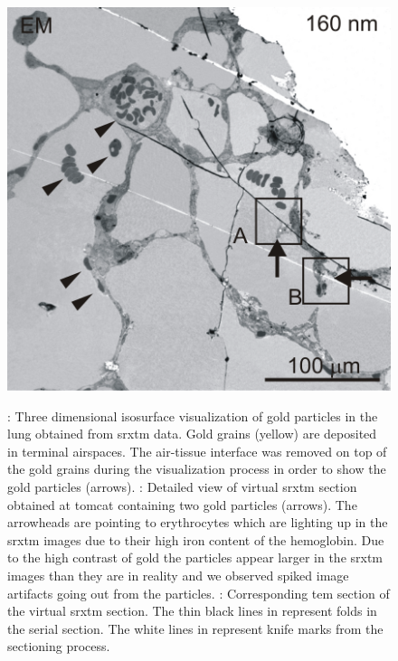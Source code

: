 \begin{figure}
{		\includegraphics[height=\imsize]{img/XRM2008/em/au900-1b-b}%
		\label{subfig:slice-em}%
		}%
	\caption[Three dimensional isosurface visualization of gold particles in the lung obtained from SRXTM data]{: Three dimensional isosurface visualization of gold particles in the lung obtained from \ac{srxtm} data. Gold grains (yellow) are deposited in terminal airspaces. The air-tissue interface was removed on top of the gold grains during the visualization process in order to show the gold particles (arrows). : Detailed view of virtual \ac{srxtm} section obtained at \ac{tomcat} containing two gold particles (arrows). The arrowheads are pointing to erythrocytes which are lighting up in the \ac{srxtm} images due to their high iron content of the hemoglobin. Due to the high contrast of gold the particles appear larger in the \ac{srxtm} images than they are in reality and we observed spiked image artifacts going out from the particles. : Corresponding \ac{tem} section of the virtual \ac{srxtm} section. The thin black lines in  represent folds in the serial section. The white lines in  represent knife marks from the sectioning process.}%
	\label{fig:imaris}%
\end{figure}

